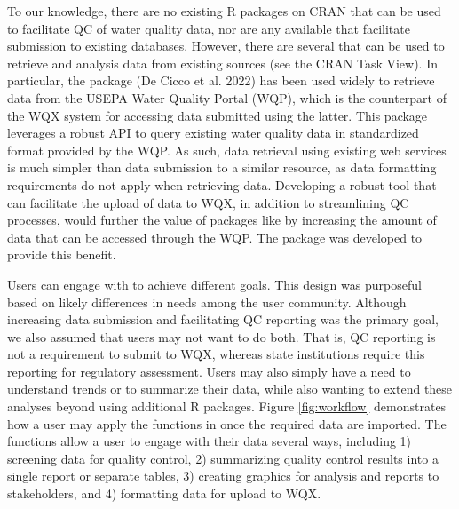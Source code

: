 To our knowledge, there are no existing R packages on CRAN that can be used to facilitate QC of water quality data, nor are any available that facilitate submission to existing databases. However, there are several that can be used to retrieve and analysis data from existing sources (see the CRAN  Task View). In particular, the  package (De Cicco et al. 2022) has been used widely to retrieve data from the USEPA Water Quality Portal (WQP), which is the counterpart of the WQX system for accessing data submitted using the latter. This package leverages a robust API to query existing water quality data in standardized format provided by the WQP. As such, data retrieval using existing web services is much simpler than data submission to a similar resource, as data formatting requirements do not apply when retrieving data. Developing a robust tool that can facilitate the upload of data to WQX, in addition to streamlining QC processes, would further the value of packages like  by increasing the amount of data that can be accessed through the WQP. The  package was developed to provide this benefit.

Users can engage with  to achieve different goals. This design was purposeful based on likely differences in needs among the user community. Although increasing data submission and facilitating QC reporting was the primary goal, we also assumed that users may not want to do both. That is, QC reporting is not a requirement to submit to WQX, whereas state institutions require this reporting for regulatory assessment. Users may also simply have a need to understand trends or to summarize their data, while also wanting to extend these analyses beyond  using additional R packages. Figure \ref{fig:workflow} demonstrates how a user may apply the functions in  once the required data are imported. The functions allow a user to engage with their data several ways, including 1) screening data for quality control, 2) summarizing quality control results into a single report or separate tables, 3) creating graphics for analysis and reports to stakeholders, and 4) formatting data for upload to WQX.

